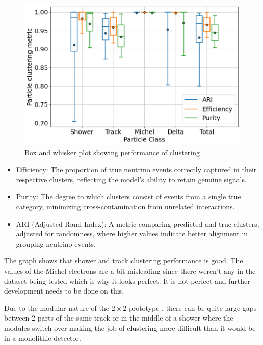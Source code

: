 \begin{figure}[H]
  \centering
  \includegraphics[width=120mm]{figures/clusteringPerformance.png}
  \caption{Box and whisker plot showing performance of clustering}
  \label{clusteringPerformance}
\end{figure}

\begin{itemize}
\item Efficiency: The proportion of true neutrino events correctly captured in their respective clusters, reflecting the model's ability to retain genuine signals.

\item Purity: The degree to which clusters consist of events from a single true category, minimizing cross-contamination from unrelated interactions.

\item ARI (Adjusted Rand Index): A metric comparing predicted and true clusters, adjusted for randomness, where higher values indicate better alignment in grouping neutrino events.
\end{itemize}

The graph shows that shower and track clustering performance is good.
The values of the Michel electrons are a bit misleading since there weren't any in the dataset being tested which is why it looks perfect.
It is not perfect and further development needs to be done on this.
  
Due to the modular nature of the $2 \times 2$ prototype , there can be quite large gaps between 2 parts of the same track or in the middle of a shower where the modules  switch over making the job of clustering more difficult than it would be in a monolithic detector.

